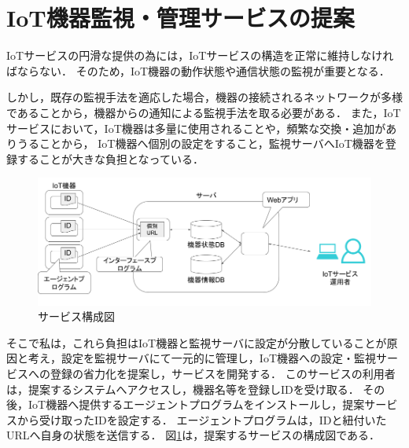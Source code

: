 \section{IoT機器監視・管理サービスの提案}
IoTサービスの円滑な提供の為には，IoTサービスの構造を正常に維持しなければならない．
そのため，IoT機器の動作状態や通信状態の監視が重要となる．

しかし，既存の監視手法を適応した場合，機器の接続されるネットワークが多様であることから，機器からの通知による監視手法を取る必要がある．
また，IoTサービスにおいて，IoT機器は多量に使用されることや，頻繁な交換・追加がありうることから，
IoT機器へ個別の設定をすること，監視サーバへIoT機器を登録することが大きな負担となっている．
\medskip

\begin{figure}[htbp]
\includegraphics[width=16cm]{images/prop_diag.png}
\caption{サービス構成図}
\label{fig:prop_diag}
\end{figure}
そこで私は，これら負担はIoT機器と監視サーバに設定が分散していることが原因と考え，設定を監視サーバにて一元的に管理し，IoT機器への設定・監視サービスへの登録の省力化を提案し，サービスを開発する．
このサービスの利用者は，提案するシステムへアクセスし，機器名等を登録しIDを受け取る．
その後，IoT機器へ提供するエージェントプログラムをインストールし，提案サービスから受け取ったIDを設定する．
エージェントプログラムは，IDと紐付いたURLへ自身の状態を送信する．
図\ref{fig:prop_diag}は，提案するサービスの構成図である．
\newpage

